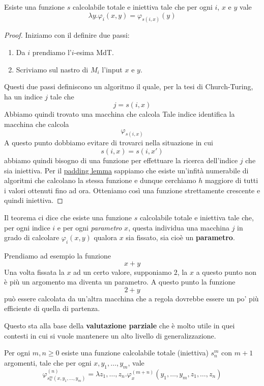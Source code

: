 \begin{theorem}
	\label{th: s-1-1}
	Esiste una funzione $s$ calcolabile totale e iniettiva tale
	che per ogni $i$, $x$ e $y$ vale
	\[ \lambda y . \varphi_i (x, y) = \varphi_{s (i, x)} (y) \]
	\begin{proof}
		Iniziamo con il definire due passi:
		\begin{enumerate}
			\item Da $i$ prendiamo l'$i$-esima MdT.
			\item Scriviamo sul nastro di $M_i$ l'input $x$ e
			      $y$.
		\end{enumerate}
		Questi due passi definiscono un algoritmo il quale, per
		la tesi di Church-Turing, ha un indice $j$ tale che
		\[ j = s(i, x) \]
		Abbiamo quindi trovato una macchina che calcola
		Tale indice identifica la macchina che calcola
		\[ \varphi_{s(i,x)} \]
		A questo punto dobbiamo evitare di trovarci nella
		situazione in cui
		\[ s(i, x) = s(i, x') \]
		abbiamo quindi bisogno di una funzione per effettuare la
		ricerca dell'indice $j$ che sia iniettiva. Per il
		\hyperref[th: padding lemma]{padding lemma} sappiamo che
		esiste un'infità numerabile di algoritmi che calcolano
		la stessa funzione e dunque cerchiamo $h$ maggiore di
		tutti i valori ottenuti fino ad ora. Otteniamo così una
		funzione strettamente crescente e quindi iniettiva.
	\end{proof}
\end{theorem}

Il teorema ci dice che esiste una funzione $s$ calcolabile
totale e iniettiva tale che, per ogni indice $i$ e per ogni
\emph{parametro} $x$, questa individua una macchina $j$ in grado
di calcolare $\varphi_i (x, y)$ qualora $x$ sia fissato, sia
cioè un \textbf{parametro}.

\begin{example}
	Prendiamo ad esempio la funzione
	\[ x + y \]
	Una volta fissata la $x$ ad un certo valore, supponiamo
	$2$, la $x$ a questo punto non è più un argomento ma
	diventa un parametro. A questo punto la funzione
	\[ 2 + y \]
	può essere calcolata da un'altra macchina che a regola
	dovrebbe essere un po' più efficiente di quella di partenza.
\end{example}

Questo sta alla base della \textbf{valutazione parziale} che è
molto utile in quei contesti in cui si vuole mantenere un alto
livello di generalizzazione.

\begin{theorem}
	\label{th: s-m-n}
	Per ogni $m, n \geq 0$ esiste una funzione calcolabile
	totale (iniettiva) $s_n^m$ con $m+1$ argomenti, tale che
	per ogni $x, y_1, \dots, y_m$, vale
	\[
		\varphi_{s_n^m (x, y_1, \dots, y_m)}^{(n)} =
		\lambda z_1, \dots, z_n .
		\varphi_x^{(m+n)} (y_1, \dots, y_m, z_1, \dots, z_n)
	\]
\end{theorem}

